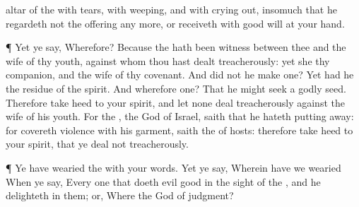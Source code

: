 {altar of the
{} with
tears, with
weeping, and with crying
out, insomuch that he
regardeth not the
offering any more, or
receiveth
{} with good
will at your
hand.
\par }{\PP {}¶ Yet ye
say,
Wherefore? Because the
{} hath been
witness between thee and the
wife of thy
youth, against whom thou hast dealt
treacherously: yet
{} she thy
companion, and the
wife of thy
covenant.
And did not he
make
one? Yet had he the
residue of the
spirit. And wherefore
one? That he might
seek a
godly
seed. Therefore take
heed to your
spirit, and let none deal
treacherously against the
wife of his
youth.
For the
{}, the
God of
Israel,
saith that he
hateth putting
away: for
{}
covereth
violence with his
garment,
saith the
{} of
hosts: therefore take
heed to your
spirit, that ye deal not
treacherously.
\par }{\PP {}¶ Ye have
wearied the
{} with your
words. Yet ye
say, Wherein have we
wearied
{} When ye
say, Every one that
doeth
evil
{}
good in the
sight of the
{}, and he
delighteth in them; or, Where
{} the
God of
judgment?

}
